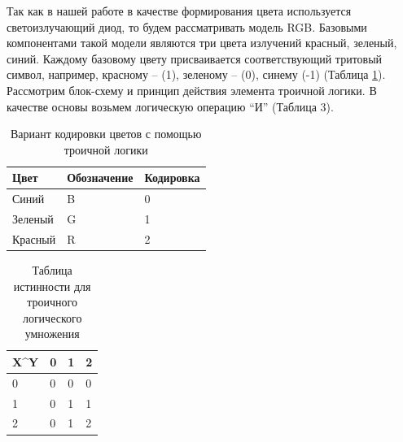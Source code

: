 \documentclass[10pt]{beamer}
\begin{document}
\begin{frame}[shrink=20,fragile]
\transdissolve[duration=0.2]

\begin{block}{}
	Так как в нашей работе в качестве формирования цвета используется светоизлучающий диод, то будем рассматривать модель RGB. Базовыми компонентами такой модели являются три цвета излучений красный, зеленый, синий. Каждому базовому цвету присваивается соответствующий тритовый символ, например, красному – (1), зеленому – (0), синему (-1) (Таблица \ref{tab2}).
Рассмотрим блок-схему и принцип действия элемента троичной логики. В качестве основы возьмем логическую операцию “И” (Таблица 3).
\begin{table}[]
\centering
\caption{Вариант кодировки цветов с помощью троичной логики}
\label{tab2}
\begin{tabular}{|l|l|l|}
\hline
Цвет    & Обозначение & Кодировка \\ \hline
Синий   & B           & 0         \\ \hline
Зеленый & G           & 1         \\ \hline
Красный & R           & 2         \\ \hline
\end{tabular}
\end{table}
	
	
\begin{table}[]
\centering
\caption{Таблица истинности для троичного логического умножения}
\label{tab3}
\begin{tabular}{|l|l|l|l|}
\hline
X\textasciicircum{}Y & 0 & 1 & 2 \\ \hline
0                    & 0 & 0 & 0 \\ \hline
1                    & 0 & 1 & 1 \\ \hline
2                    & 0 & 1 & 2 \\ \hline
\end{tabular}
\end{table}
\end{block}   

\end{frame}
\end{document}
